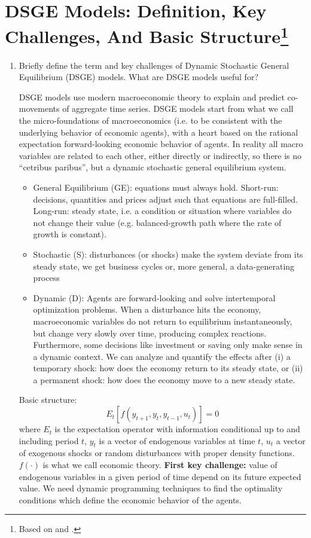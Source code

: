 \documentclass[a4paper]{scrartcl}
\newif\ifpartDSGE
\begin{document}
\ifpartDSGE

    \section[DSGE Models: Definition, Key Challenges, And Basic Structure]{DSGE Models: Definition, Key Challenges, And Basic Structure\footnote{Based on \citet[Ch.~1]{Torres.2015} and \citet{FVRRS.2016}.}}
    \begin{enumerate}
        \item Briefly define the term and key challenges of Dynamic Stochastic General Equilibrium (DSGE) models. What are DSGE models useful for?
              \begin{solution}
                  DSGE models use modern macroeconomic theory to explain and predict co-movements of aggregate time series. DSGE models start from what we call the micro-foundations of macroeconomics (i.e. to be consistent with the underlying behavior of economic agents), with a heart based on the rational expectation forward-looking economic behavior of agents. In reality all macro variables are related to each other, either directly or indirectly, so there is no \enquote{cetribus paribus}, but a dynamic stochastic general equilibrium system.
                  \begin{itemize}
                      \item General Equilibrium (GE): equations must always hold. Short-run: decisions, quantities and prices adjust such that equations are full-filled. Long-run: steady state, i.e. a condition or situation where variables do not change their value (e.g. balanced-growth path where the rate of growth is constant).
                      \item Stochastic (S): disturbances (or shocks) make the system deviate from its steady state, we get business cycles or, more general, a data-generating process
                      \item Dynamic (D): Agents are forward-looking and solve intertemporal optimization problems. When a disturbance hits the economy, macroeconomic variables do not return to equilibrium instantaneously, but change very slowly over time, producing complex reactions. Furthermore, some decisions like investment or saving only make sense in a dynamic context. We can analyze and quantify the effects after (i) a temporary shock: how does the economy return to its steady state, or (ii) a permanent shock: how does the economy move to a new steady state.
                  \end{itemize}
                  Basic structure:
                  $$ E_t \left[f(y_{t+1}, y_t, y_{t-1},u_t)\right]=0$$
                  where $E_t$ is the expectation operator with information conditional up to and including period $t$, $y_t$ is a vector of endogenous variables at time $t$, $u_t$ a vector of exogenous shocks or random disturbances with proper density functions. $f(\cdot)$ is what we call economic theory. \textbf{First key challenge:} value of endogenous variables in a given period of time depend on its future expected value. We need dynamic programming techniques to find the optimality conditions which define the economic behavior of the agents.
                  

\end{solution}
\end{enumerate}
\end{document}

